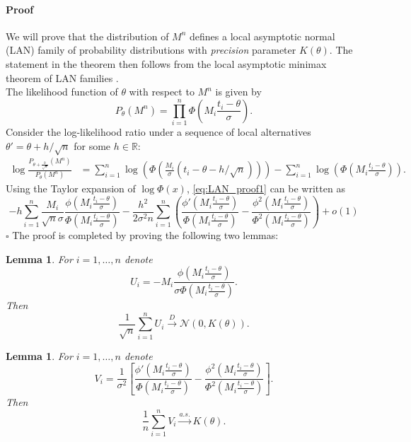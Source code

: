 \documentclass[letterpaper, conference]{IEEEtran}      %
\newtheorem{lem}[thm]{\bf {Lemma}}
\newenvironment{proof}{\paragraph*{Proof}}{\hfill$\square$ \newline}
\begin{document}
\begin{proof}
We will prove that the distribution of $M^n$ defines a local asymptotic normal (LAN) family of probability distributions with \emph{precision} parameter $K(\theta)$. The statement in the theorem then follows from the local asymptotic minimax theorem of LAN families \cite{van2000asymptotic}. \\

The likelihood function of $\theta$ with respect to $M^n$ is given by
\[
P_\theta(M^n) =  \prod_{i=1}^n  \Phi \left( M_i \frac{t_i - \theta}{\sigma} \right). 
\]
Consider the log-likelihood ratio under a sequence of local alternatives $\theta' = \theta + h/\sqrt{n}$ for some $h\in \mathbb R$:
\begin{align}
\log \frac{ P_{\theta + \frac{h}{\sqrt{n}}}(M^n)} { P_\theta (M^n) }& =  \sum_{i=1}^n \log \left(  \Phi \left( \frac{M_i}{\sigma} (t_i - \theta - h/\sqrt{n} ) \right)\right)  - \sum_{i=1}^n \log \left( \Phi \left( M_i \frac{t_i - \theta}{\sigma} \right) \right). \label{eq:LAN_proof1}
\end{align}
Using the Taylor expansion of $\log \Phi(x)$, \eqref{eq:LAN_proof1} can be written as
\[
- h \sum_{i=1}^n  \frac{M_i}{\sqrt{n} \sigma }  \frac{ \phi \left(M_i\frac{t_i-\theta}{\sigma} \right)} {\Phi \left( M_i \frac{t_i-\theta}{\sigma} \right) }  - \frac{h^2}{2 \sigma^2 n} \sum_{i=1}^n   \left( \frac{\phi' \left(M_i \frac{t_i-\theta}{\sigma} \right) }{\Phi\left(M_i \frac{t_i-\theta}{\sigma}\right) }- \frac{ \phi^2\left(M_i \frac{t_i-\theta}{\sigma} \right)}{\Phi^2\left(M_i \frac{t_i-\theta}{\sigma} \right)}   \right) + o(1)
\] 
\end{proof}
The proof is completed by proving the following two lemmas:
\begin{lem} \label{lem:LAN1}
For $i=1,\ldots,n$ denote 
\[
U_i = -M_i \frac{ \phi \left( M_i \frac{t_i - \theta}{\sigma} \right)}{ \sigma \Phi \left( M_i \frac{t_i - \theta}{\sigma}\right) }. 
\]
Then 
\[
\frac{1}{\sqrt{n}} \sum_{i=1}^n U_i \overset{D}{\rightarrow} \mathcal N\left(0, K(\theta) \right). 
\]
\end{lem}
\begin{lem} \label{lem:LAN2}
For $i=1,\ldots,n$ denote
\[
V_i = \frac{1}{\sigma^2} \left[ \frac{\phi' \left(M_i \frac{t_i-\theta}{\sigma} \right) }{\Phi\left(M_i \frac{t_i-\theta}{\sigma}\right) }- \frac{ \phi^2\left(M_i \frac{t_i-\theta}{\sigma} \right)}{\Phi^2\left(M_i \frac{t_i-\theta}{\sigma} \right)} \right] .
\]
Then 
\[
\frac{1}{n} \sum_{i=1}^n V_i \overset{a.s.}{\rightarrow} K(\theta). 
\]
\end{lem}
\end{document}
